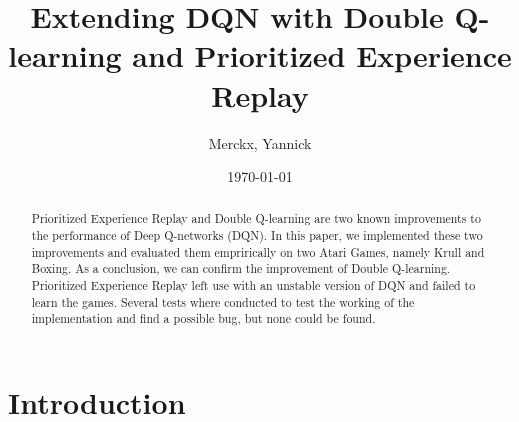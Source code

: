 \documentclass{sig-alternate}
\begin{document}
%
\crdata{ }

\title{Extending DQN with Double Q-learning and Prioritized Experience Replay}

\author{
\alignauthor Merckx, Yannick\\
}
\date{\today}


\maketitle
\begin{abstract}

Prioritized Experience Replay and Double Q-learning are two known improvements to the performance of Deep Q-networks (DQN). In this paper, we implemented these two improvements and evaluated them emprirically on two Atari Games, namely Krull and Boxing. As a conclusion, we can confirm the improvement of Double Q-learning. Prioritized Experience Replay left use with an unstable version of DQN and failed to learn the games. Several tests where conducted to test the working of the implementation and find a possible bug, but none could be found.

\end{abstract}

\section{Introduction}
\end{document}
